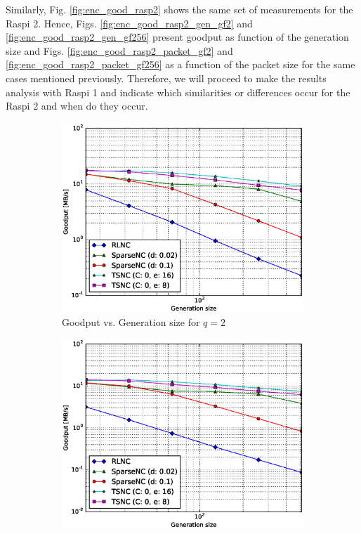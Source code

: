 Similarly, Fig. \ref{fig:enc_good_rasp2} shows the same set of
measurements for the \ac{Raspi} 2. Hence, Figs.
\ref{fig:enc_good_rasp2_gen_gf2} and \ref{fig:enc_good_rasp2_gen_gf256}
present goodput as function of the generation size  and
Figs. \ref{fig:enc_good_rasp2_packet_gf2} and
\ref{fig:enc_good_rasp2_packet_gf256} as a function of the packet size
for the same cases mentioned previously. Therefore, we will proceed
to make the results analysis with \ac{Raspi} 1 and indicate which
similarities or differences occur for the \ac{Raspi} 2 and when do
they occur.
%
\begin{figure}
    \centering
    \begin{subfigure}[b]{0.475\textwidth}
        \centering
        \includegraphics[width=1.15\textwidth]{images/06_06_2016/goodput_vs_generation_size_Rasp_encoder_Binary_1600.eps}
        \caption[]%
        {{\small Goodput vs. Generation size for $q = 2$}}
        \label{fig:enc_good_rasp1_gen_gf2}
    \end{subfigure}
    \hfill
    \begin{subfigure}[b]{0.475\textwidth}
        \centering
        \includegraphics[width=1.15\textwidth]{images/06_06_2016/goodput_vs_generation_size_Rasp_encoder_Binary8_1600.eps}

\end{subfigure}
\end{figure}
